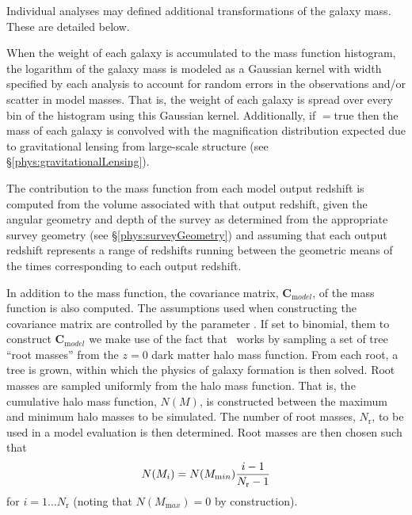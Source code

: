 Individual analyses may defined additional transformations of the galaxy mass. These are detailed below.

When the weight of each galaxy is accumulated to the mass function histogram, the logarithm of the galaxy mass is modeled as a Gaussian kernel with width specified by each analysis to account for random errors in the observations and/or scatter in model masses. That is, the weight of each galaxy is spread over every bin of the histogram using this Gaussian kernel. Additionally, if {\normalfont \ttfamily [analysisMassFunctionsApplyGravitationalLensing]}$=${\normalfont \ttfamily true} then the mass of each galaxy is convolved with the magnification distribution expected due to gravitational lensing from large-scale structure (see \S\ref{phys:gravitationalLensing}).

The contribution to the mass function from each model output redshift is computed from the volume associated with that output redshift, given the angular geometry and depth of the survey as determined from the appropriate survey geometry (see \S\ref{phys:surveyGeometry}) and assuming that each output redshift represents a range of redshifts running between the geometric means of the times corresponding to each output redshift. 

In addition to the mass function, the covariance matrix, ${\mathbf C}_{\mathrm model}$, of the mass function is also computed. The assumptions used when constructing the covariance matrix are controlled by the parameter {\normalfont \ttfamily [analysisMassFunctionCovarianceModel]}. If set to {\normalfont \ttfamily binomial}, them to construct ${\mathbf C}_{\mathrm model}$ we make use of the fact that \glc\ works by sampling a set of tree ``root masses'' from the $z=0$ dark matter halo mass function. From each root, a tree is grown, within which the physics of galaxy formation is then solved. Root masses are sampled uniformly from the halo mass function. That is, the cumulative halo mass function, $N(M)$, is constructed between the maximum and minimum halo masses to be simulated. The number of root masses, $N_{\mathrm r}$, to be used in a model evaluation is then determined. Root masses are then chosen such that
\begin{equation}
 N(M_i) = N(M_{\mathrm min}) {i-1 \over N_{\mathrm r}-1}
\end{equation}
for $i=1\ldots N_{\mathrm r}$ (noting that $N(M_{\mathrm max})=0$ by construction). 

